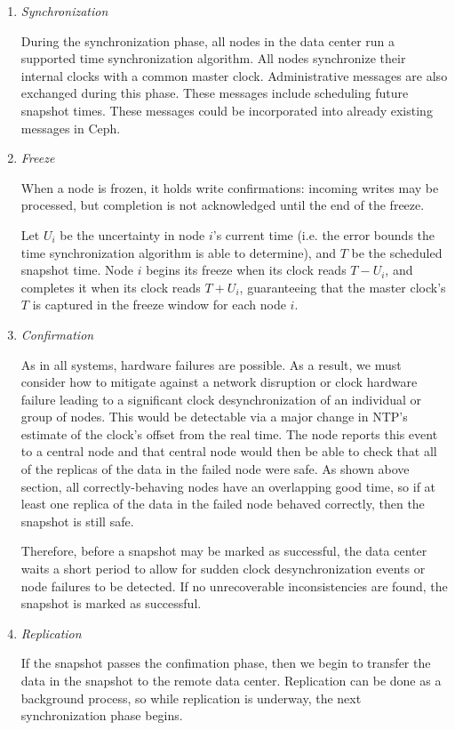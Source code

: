 \begin{enumerate}

\item \emph{Synchronization}

  During the synchronization phase, all nodes in the data center run a supported time
  synchronization algorithm. All nodes synchronize their
  internal clocks with a common master
  clock\footnotemark. Administrative messages are also exchanged
  during this phase. These messages include scheduling future snapshot
  times. These messages could be incorporated into already existing messages
  in Ceph.


\item \emph{Freeze}
  
  When a node is frozen, it holds write confirmations: incoming writes
  may be processed, but completion is not acknowledged until the end
  of the freeze.
  
  Let $U_i$ be the uncertainty in node $i$'s current time (i.e. the
  error bounds the time synchronization algorithm is able to
  determine), and $T$ be the scheduled snapshot time. Node $i$ begins
  its freeze when its clock reads $T - U_i$, and completes it when its
  clock reads $T + U_i$, guaranteeing that the master clock's $T$ is
  captured in the freeze window for each node $i$.

\item \emph{Confirmation}

  As in all systems, hardware failures are possible. As a result, we
  must consider how to mitigate against a network disruption or clock
  hardware failure leading to a significant clock desynchronization of
  an individual or group of nodes. This would be detectable via a major
  change in NTP's estimate of the clock's offset from the real time.
  The node reports this event to a central node and that central node would 
  then be able to check that all of the replicas of the data in the failed 
  node were safe. As shown above section, all correctly-behaving nodes have an
  overlapping good time, so if at least one replica of the data in the failed 
  node behaved correctly, then the snapshot is still safe.
  
  Therefore, before a snapshot may be marked as successful, the data center 
  waits a short period to allow for sudden clock desynchronization
  events or node failures to be detected. If no unrecoverable inconsistencies 
  are found, the snapshot is marked as successful.

\item \emph{Replication}
  
  If the snapshot passes the confimation phase, then we begin to transfer the 
  data in the snapshot to the remote data center. Replication can be done as a 
  background process, so while replication is underway, the next 
  synchronization phase begins.

\end{enumerate}
